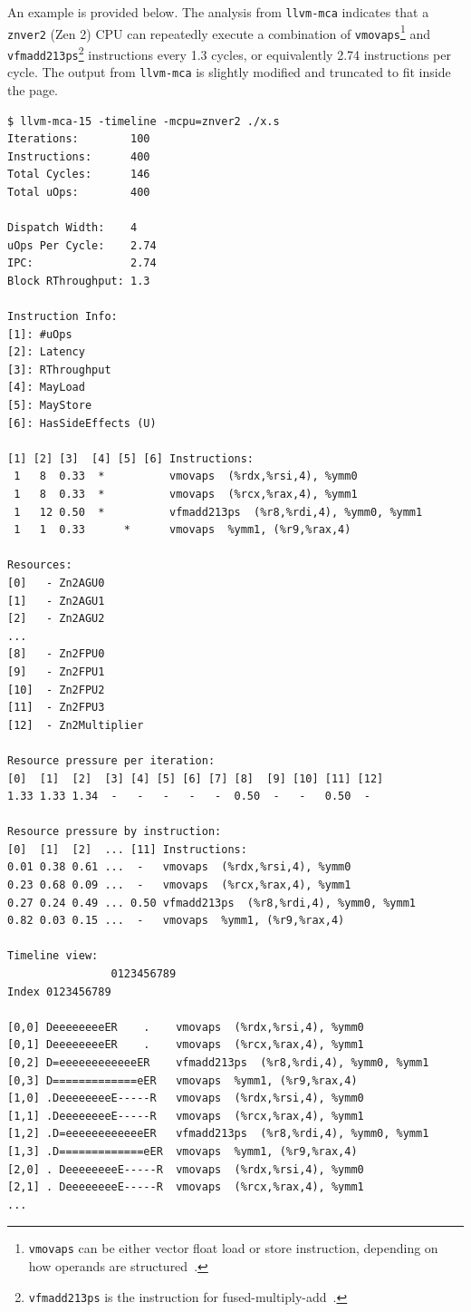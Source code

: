 \documentclass[logo,bsc,singlespacing,parskip]{infthesis}
\newcommand{\mca}{\texttt{llvm-mca}}
\begin{document}
An example is provided below. The analysis from \mca{} indicates that a
\texttt{znver2} (Zen 2) CPU can repeatedly execute a combination of
\texttt{vmovaps}\footnote{\texttt{vmovaps} can be either vector float load or
store instruction, depending on how operands are structured~\cite{instruction}.}
and \texttt{vfmadd213ps}\footnote{\texttt{vfmadd213ps} is the instruction for
fused-multiply-add~\cite{instruction}.} instructions every 1.3 cycles, or 
equivalently 2.74 instructions per cycle. The output from \mca{} is slightly
modified and truncated to fit inside the page.

\begin{verbatim}
$ llvm-mca-15 -timeline -mcpu=znver2 ./x.s 
Iterations:        100
Instructions:      400
Total Cycles:      146
Total uOps:        400

Dispatch Width:    4
uOps Per Cycle:    2.74
IPC:               2.74
Block RThroughput: 1.3

Instruction Info:
[1]: #uOps
[2]: Latency
[3]: RThroughput
[4]: MayLoad
[5]: MayStore
[6]: HasSideEffects (U)

[1] [2] [3]  [4] [5] [6] Instructions:
 1   8  0.33  *          vmovaps  (%rdx,%rsi,4), %ymm0
 1   8  0.33  *          vmovaps  (%rcx,%rax,4), %ymm1
 1   12 0.50  *          vfmadd213ps  (%r8,%rdi,4), %ymm0, %ymm1
 1   1  0.33      *      vmovaps  %ymm1, (%r9,%rax,4)

Resources:
[0]   - Zn2AGU0
[1]   - Zn2AGU1
[2]   - Zn2AGU2
...
[8]   - Zn2FPU0
[9]   - Zn2FPU1
[10]  - Zn2FPU2
[11]  - Zn2FPU3
[12]  - Zn2Multiplier

Resource pressure per iteration:
[0]  [1]  [2]  [3] [4] [5] [6] [7] [8]  [9] [10] [11] [12]   
1.33 1.33 1.34  -   -   -   -   -  0.50  -   -   0.50  -     

Resource pressure by instruction:
[0]  [1]  [2]  ... [11] Instructions:
0.01 0.38 0.61 ...  -   vmovaps  (%rdx,%rsi,4), %ymm0
0.23 0.68 0.09 ...  -   vmovaps  (%rcx,%rax,4), %ymm1
0.27 0.24 0.49 ... 0.50 vfmadd213ps  (%r8,%rdi,4), %ymm0, %ymm1
0.82 0.03 0.15 ...  -   vmovaps  %ymm1, (%r9,%rax,4)

Timeline view:
                0123456789      
Index 0123456789           

[0,0] DeeeeeeeeER    .    vmovaps  (%rdx,%rsi,4), %ymm0
[0,1] DeeeeeeeeER    .    vmovaps  (%rcx,%rax,4), %ymm1
[0,2] D=eeeeeeeeeeeeER    vfmadd213ps  (%r8,%rdi,4), %ymm0, %ymm1
[0,3] D=============eER   vmovaps  %ymm1, (%r9,%rax,4)
[1,0] .DeeeeeeeeE-----R   vmovaps  (%rdx,%rsi,4), %ymm0
[1,1] .DeeeeeeeeE-----R   vmovaps  (%rcx,%rax,4), %ymm1
[1,2] .D=eeeeeeeeeeeeER   vfmadd213ps  (%r8,%rdi,4), %ymm0, %ymm1
[1,3] .D=============eER  vmovaps  %ymm1, (%r9,%rax,4)
[2,0] . DeeeeeeeeE-----R  vmovaps  (%rdx,%rsi,4), %ymm0
[2,1] . DeeeeeeeeE-----R  vmovaps  (%rcx,%rax,4), %ymm1
...

\end{verbatim}
\end{document}
